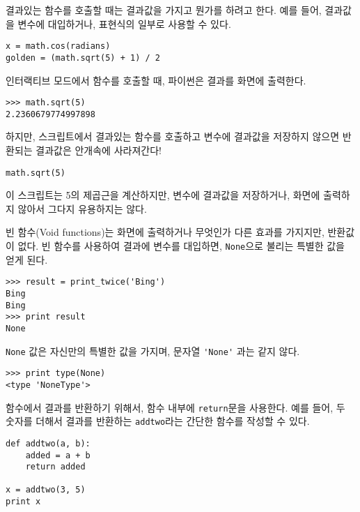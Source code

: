 결과있는 함수를 호출할 때는 결과값을 가지고 뭔가를 하려고 한다. 
예를 들어, 결과값을 변수에 대입하거나, 표현식의 일부로 사용할 수 있다.

\beforeverb
\begin{verbatim}
x = math.cos(radians)
golden = (math.sqrt(5) + 1) / 2
\end{verbatim}
\afterverb
%

인터랙티브 모드에서 함수를 호출할 때, 파이썬은 결과를 화면에 출력한다.

\beforeverb
\begin{verbatim}
>>> math.sqrt(5)
2.2360679774997898
\end{verbatim}
\afterverb
%

하지만, 스크립트에서 결과있는 함수를 호출하고 변수에 결과값을 저장하지 않으면 반환되는 결과값은 안개속에 사라져간다!

\beforeverb
\begin{verbatim}
math.sqrt(5)
\end{verbatim}
\afterverb
%
이 스크립트는 5의 제곱근을 계산하지만, 변수에 결과값을 저장하거나, 화면에 출력하지 않아서 그다지 유용하지는 않다.


빈 함수(Void functions)는 화면에 출력하거나 무엇인가 다른 효과를 가지지만, 반환값이 없다.
빈 함수를 사용하여 결과에 변수를 대입하면, {\tt None}으로 불리는 특별한 값을 얻게 된다.


\beforeverb
\begin{verbatim}
>>> result = print_twice('Bing')
Bing
Bing
>>> print result
None
\end{verbatim}
\afterverb
%

{\tt None} 값은 자신만의 특별한 값을 가지며, 문자열 \verb"'None'" 과는 같지 않다. 

\beforeverb
\begin{verbatim}
>>> print type(None)
<type 'NoneType'>
\end{verbatim}
\afterverb
%

함수에서 결과를 반환하기 위해서, 함수 내부에 {\tt return}문을 사용한다.
예를 들어, 두 숫자를 더해서 결과를 반환하는 {\tt addtwo}라는 간단한 함수를 작성할 수 있다. 

\beforeverb
\begin{verbatim}
def addtwo(a, b):
    added = a + b
    return added

x = addtwo(3, 5)
print x
\end{verbatim}
\afterverb
%

